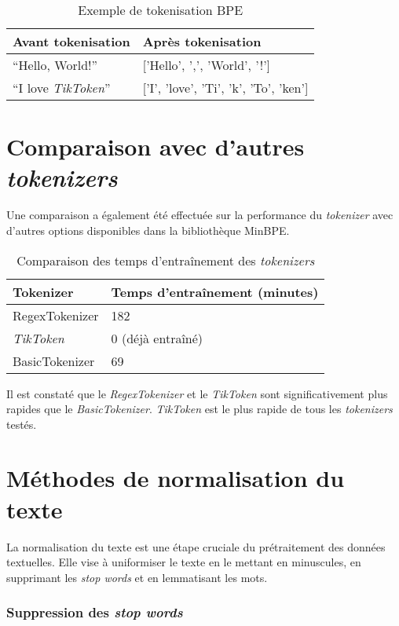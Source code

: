 \begin{table}[h]
\centering
\begin{tabular}{|l|l|}
\hline
\textbf{Avant tokenisation} & \textbf{Après tokenisation} \\ \hline
``Hello, World!'' & ['Hello', ',', 'World', '!'] \\ \hline
``I love \textit{TikToken}'' & ['I', 'love', 'Ti', 'k', 'To', 'ken'] \\ \hline
\end{tabular}
\caption{Exemple de tokenisation BPE}
\end{table}

\section{Comparaison avec d'autres \textit{tokenizers}}

Une comparaison a également été effectuée sur la performance du \textit{tokenizer} avec d'autres options disponibles dans la bibliothèque MinBPE.

\begin{table}[h]
\centering
\begin{tabular}{|l|l|}
\hline
\textbf{Tokenizer} & \textbf{Temps d'entraînement (minutes)} \\ \hline
RegexTokenizer & 182 \\ \hline
\textit{TikToken} & 0 (déjà entraîné) \\ \hline
BasicTokenizer & 69 \\ \hline
\end{tabular}
\caption{Comparaison des temps d'entraînement des \textit{tokenizers}}
\end{table}


Il est constaté que le \textit{RegexTokenizer} et le \textit{TikToken} sont significativement plus rapides que le \textit{BasicTokenizer}. \textit{TikToken} est le plus rapide de tous les \textit{tokenizers} testés.

\section{Méthodes de normalisation du texte}
La normalisation du texte est une étape cruciale du prétraitement des données textuelles. Elle vise à uniformiser le texte en le mettant en minuscules, en supprimant les \textit{stop words} et en lemmatisant les mots.

\subsubsection*{Suppression des \textit{stop words}}

